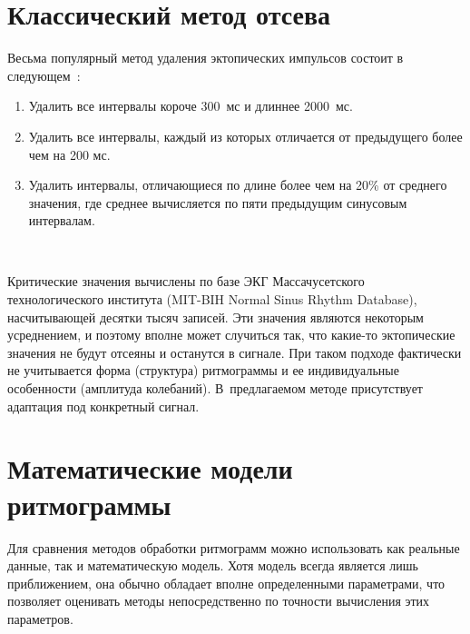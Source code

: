 \begin{multicols}{2}
\section{Классический метод отсева}

Весьма популярный метод удаления эктопических импульсов состоит в
следующем~\cite{2ma}:
\begin{enumerate}[1.]
    \item Удалить все интервалы короче 300~мс и длиннее 2000~мс.
    \item Удалить все интервалы, каждый из которых отличается от предыдущего более чем на 200 мс.
    \item Удалить интервалы, отличающиеся по длине более чем на 20\% от среднего значения, где
    среднее вычисляется по пяти предыдущим синусовым интервалам.
\end{enumerate}

\begin{figure*} %
\vspace*{1pt}
\begin{center}
\mbox{%
\epsfxsize=159.156mm
}
\end{center}
\vspace*{-6pt}
\vspace*{3pt}
\end{figure*}

Критические значения  вычислены по базе ЭКГ
Массачусетского технологического института (MIT-BIH Normal Sinus
Rhythm Database), насчитывающей десятки тысяч записей. Эти
значения являются некоторым усреднением, и поэтому вполне может
случиться так, что какие-то эктопические значения не будут отсеяны
и останутся в сигнале. При таком подходе фактически не учитывается
форма (структура) ритмограммы и ее индивидуальные особенности
(амплитуда колебаний). В~предлагаемом методе присутствует
адаптация под конкретный сигнал.


\section{Математические модели ритмограммы}%

Для сравнения методов обработки ритмограмм можно использовать как
реальные данные, так и математическую модель. Хотя модель всегда
является лишь приближением, она обычно обладает вполне
определенными параметрами, что позволяет оценивать методы
непосредственно по точности вычисления этих параметров.


\end{multicols}
